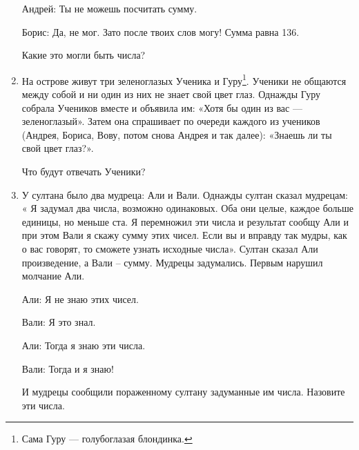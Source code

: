 \documentclass[12pt]{article}
\theoremstyle{definition}
\begin{document}
\begin{enumerate}
Андрей: Ты не можешь посчитать сумму.

Борис: Да, не мог. Зато после твоих слов могу! Сумма равна 136. 

Какие это могли быть числа?

\begin{comment}
\item Два детектива расследуют Загадочное убийство. 

Возможны девять вариантов:

\begin{tabular}{cccccccccc}
\toprule
Вариант & А & Б & В & Г & Д & Е & Ё & Ж & З \\
\midrule
Место & Москва & Москва & Москва & Москва & Москва & Москва & Москва & Москва & Москва & \\
Погода & Москва & Москва & Москва & Москва & Москва & Москва & Москва & Москва & Москва & \\
Орудие & Москва & Москва & Москва & Москва & Москва & Москва & Москва & Москва & Москва & \\
\bottomrule
\end{tabular}

Задачка по мотивам Common knowledge, Geanakoplos. Статья из handbook of game theory.

\end{comment}

\item На острове живут три зеленоглазых Ученика и Гуру\footnote{Сама Гуру — голубоглазая блондинка.}.
Ученики не общаются между собой и ни один из них не знает свой цвет глаз.
Однажды Гуру собрала Учеников вместе и объявила им: «Хотя бы один из вас — зеленоглазый».
Затем она спрашивает по очереди каждого из учеников (Андрея, Бориса, Вову, потом снова Андрея и так далее): 
«Знаешь ли ты свой цвет глаз?».

Что будут отвечать Ученики?


\item У султана было два мудреца: Али и Вали. Однажды султан сказал мудрецам: «
Я задумал два числа, возможно одинаковых. 
Оба они целые, каждое больше единицы, но меньше ста. 
Я перемножил эти числа и результат сообщу Али и при этом Вали я скажу сумму этих чисел. 
Если вы и вправду так мудры, как о вас говорят, то сможете узнать исходные числа».
Султан сказал Али произведение, а Вали – сумму. Мудрецы задумались. Первым нарушил молчание Али.

Али: Я не знаю этих чисел.

Вали: Я это знал.

Али: Тогда я знаю эти числа.

Вали: Тогда и я знаю! 

И мудрецы сообщили пораженному султану задуманные им числа. Назовите эти числа.

\end{enumerate}
\end{document}
